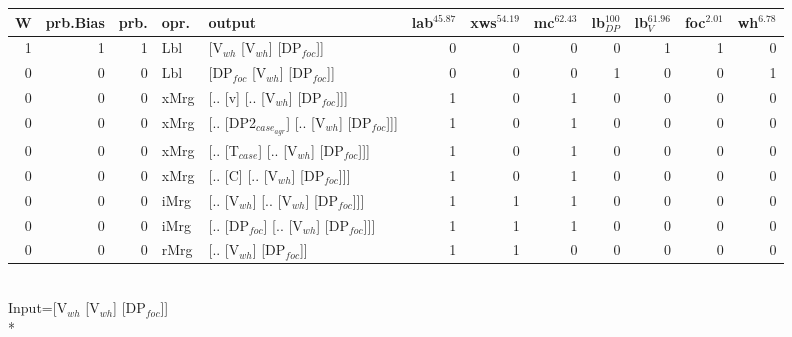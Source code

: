 \begin{tabularx}{\linewidth}{rrrlXrrrrrrr}
\hline
   W &   prb.Bias &   prb. & opr.   & output                                   &   lab$^{45.87}$ &   xws$^{54.19}$ &   mc$^{62.43}$ &   lb$_{DP}^{100}$ &   lb$_{V}^{61.96}$ &   foc$^{2.01}$ &   wh$^{6.78}$ \\
\hline
   1 &       1 &   1 & Lbl  & [V$_{wh}$ [V$_{wh}$] [DP$_{foc}$]]                   &             0 &             0 &            0 &                0 &              1 &          1 &        0 \\
   0 &       0 &   0 & Lbl  & [DP$_{foc}$ [V$_{wh}$] [DP$_{foc}$]]                 &             0 &             0 &            0 &                1 &              0 &          0 &        1 \\
   0 &       0 &   0 & xMrg & [.. [v] [.. [V$_{wh}$] [DP$_{foc}$]]]            &             1 &             0 &            1 &                0 &              0 &          0 &        0 \\
   0 &       0 &   0 & xMrg & [.. [DP2$_{case_{agr}}$] [.. [V$_{wh}$] [DP$_{foc}$]]] &             1 &             0 &            1 &                0 &              0 &          0 &        0 \\
   0 &       0 &   0 & xMrg & [.. [T$_{case}$] [.. [V$_{wh}$] [DP$_{foc}$]]]       &             1 &             0 &            1 &                0 &              0 &          0 &        0 \\
   0 &       0 &   0 & xMrg & [.. [C] [.. [V$_{wh}$] [DP$_{foc}$]]]            &             1 &             0 &            1 &                0 &              0 &          0 &        0 \\
   0 &       0 &   0 & iMrg & [.. [V$_{wh}$] [.. [V$_{wh}$] [DP$_{foc}$]]]         &             1 &             1 &            1 &                0 &              0 &          0 &        0 \\
   0 &       0 &   0 & iMrg & [.. [DP$_{foc}$] [.. [V$_{wh}$] [DP$_{foc}$]]]       &             1 &             1 &            1 &                0 &              0 &          0 &        0 \\
   0 &       0 &   0 & rMrg & [.. [V$_{wh}$] [DP$_{foc}$]]                     &             1 &             1 &            0 &                0 &              0 &          0 &        0 \\
\hline
\end{tabularx}\endgroup\\
\begingroup\scriptsize Input=[V$_{wh}$ [V$_{wh}$] [DP$_{foc}$]]\\*
